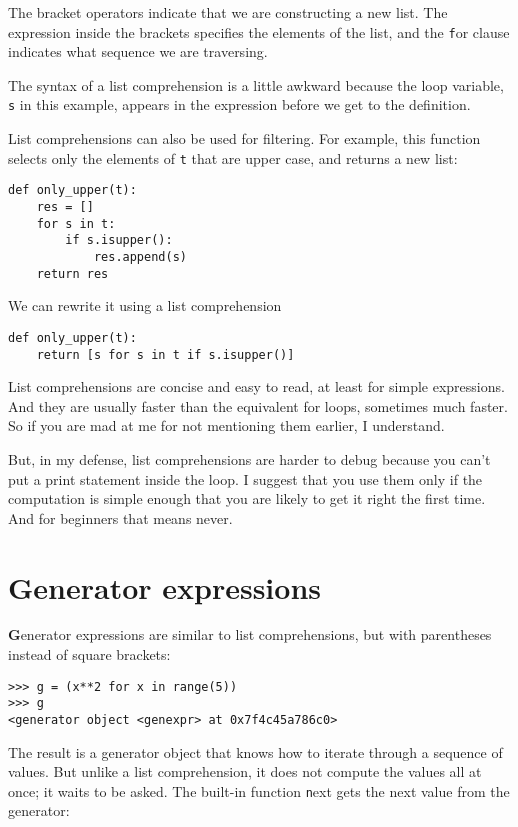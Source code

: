 \documentclass[
DIV=11,
fontsize=13,
twoside,
headinclude=false,
titlepage=firstiscover,
abstract=true,
headsepline=true,
footsepline=true,
chapterprefix=true, %
headings=big,
bibliography=totoc,%
captions=tableheading
]{scrbook}
\theoremstyle{definition}
\begin{document}
The bracket operators indicate that we are constructing a new
list.  The expression inside the brackets specifies the elements
of the list, and the {\texttt for} clause indicates what sequence
we are traversing.

The syntax of a list comprehension is a little awkward because
the loop variable, {\texttt s} in this example, appears in the expression
before we get to the definition.

List comprehensions can also be used for filtering.  For example,
this function selects only the elements of {\texttt t} that are
upper case, and returns a new list:

\begin{lstlisting}
def only_upper(t):
    res = []
    for s in t:
        if s.isupper():
            res.append(s)
    return res
\end{lstlisting}

We can rewrite it using a list comprehension

\begin{lstlisting}
def only_upper(t):
    return [s for s in t if s.isupper()]
\end{lstlisting}

List comprehensions are concise and easy to read, at least for simple
expressions.  And they are usually faster than the equivalent for
loops, sometimes much faster.  So if you are mad at me for not
mentioning them earlier, I understand.

But, in my defense, list comprehensions are harder to debug because
you can't put a print statement inside the loop.  I suggest that you
use them only if the computation is simple enough that you are likely
to get it right the first time.  And for beginners that means never.



\section{Generator expressions}

{\textbf Generator expressions} are similar to list comprehensions, but
with parentheses instead of square brackets:

\begin{lstlisting}
>>> g = (x**2 for x in range(5))
>>> g
<generator object <genexpr> at 0x7f4c45a786c0>
\end{lstlisting}
%
The result is a generator object that knows how to iterate through
a sequence of values.  But unlike a list comprehension, it does not
compute the values all at once; it waits to be asked.  The built-in
function {\texttt next} gets the next value from the generator:
\end{document}
